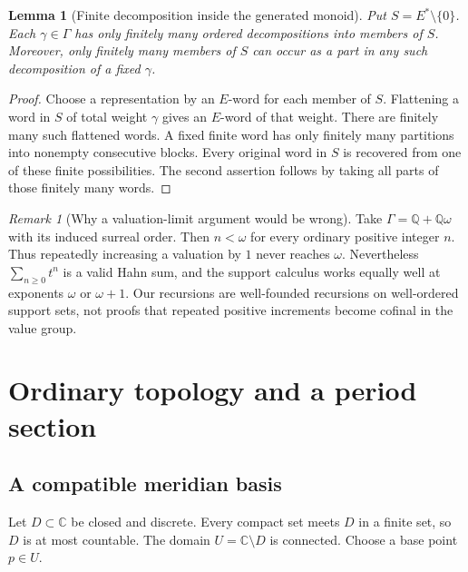 \documentclass[11pt,letterpaper]{article}
\numberwithin{equation}{section}
\newtheorem{lemma}[theorem]{Lemma}
\theoremstyle{definition}
\theoremstyle{remark}
\newtheorem{remark}[theorem]{Remark}
\newcommand{\C}{\mathbb C}
\newcommand{\Q}{\mathbb Q}
\begin{document}
\begin{lemma}[Finite decomposition inside the generated monoid]
\label{lem:finite-closure}
Put $S=E^*\setminus\{0\}$. Each $\gamma\in\Gamma$ has only finitely many
ordered decompositions into members of $S$. Moreover, only finitely many
members of $S$ can occur as a part in any such decomposition of a fixed
$\gamma$.
\end{lemma}
\begin{proof}
Choose a representation by an $E$-word for each member of $S$. Flattening a
word in $S$ of total weight $\gamma$ gives an $E$-word of that weight.
There are finitely many such flattened words. A fixed finite word has only
finitely many partitions into nonempty consecutive blocks. Every original
word in $S$ is recovered from one of these finite possibilities. The second
assertion follows by taking all parts of those finitely many words.
\end{proof}

\begin{remark}[Why a valuation-limit argument would be wrong]
Take $\Gamma=\Q+\Q\omega$ with its induced surreal order. Then $n<\omega$
for every ordinary positive integer $n$. Thus repeatedly increasing a
valuation by $1$ never reaches $\omega$. Nevertheless
$\sum_{n\geq0}t^n$ is a valid Hahn sum, and the support calculus works equally
well at exponents $\omega$ or $\omega+1$. Our recursions are well-founded
recursions on well-ordered support sets, not proofs that repeated positive
increments become cofinal in the value group.
\end{remark}

\section{Ordinary topology and a period section}\label{sec:period}

\subsection{A compatible meridian basis}
Let $D\subset\C$ be closed and discrete. Every compact set meets $D$ in a
finite set, so $D$ is at most countable. The domain $U=\C\setminus D$ is
connected. Choose a base point $p\in U$.
\end{document}
